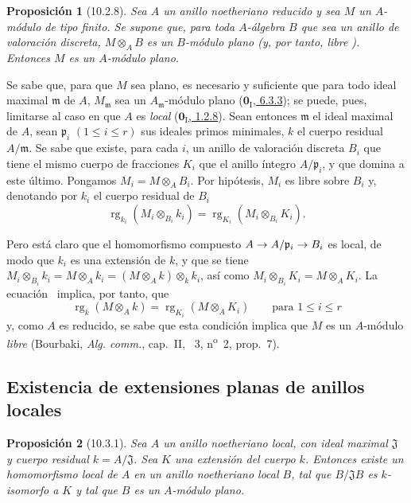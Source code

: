 \documentclass[10pt,oneside,openany]{book}
\theoremstyle{egaenv}\newtheorem*{env}{---}
\theoremstyle{egastatement}
\newtheorem*{proposition}{Proposición}
\theoremstyle{egadescription}
\renewcommand{\leq}{\leqslant}
\renewcommand{\to}{\mathchoice{\longrightarrow}{\rightarrow}{\rightarrow}{\rightarrow}}
\begin{document}
\begin{proposition}[10.2.8]
\label{0.10.2.8}
\label{0.10.2.8-fr}
Sea $A$ un anillo noetheriano reducido y sea $M$ un $A$-módulo de tipo finito.
Se supone que, para toda $A$-álgebra $B$ que sea un anillo de valoración discreta, $M\otimes_A B$ es un $B$-módulo plano (y, por tanto, libre ).
Entonces $M$ es un $A$-módulo plano.
\end{proposition}


Se sabe que, para que $M$ sea plano, es necesario y suficiente que para todo ideal maximal $\mathfrak m$ de $A$, $M_{\mathfrak m}$ sea un $A_{\mathfrak m}$-módulo plano (\hyperref[0.6.3.3-fr]{$\mathbf{0}_{\mathrm I}$, 6.3.3}); se puede, pues, limitarse al caso en que $A$ es \emph{local} (\hyperref[0.1.2.8-fr]{$\mathbf{0}_{\mathrm I}$, 1.2.8}). Sean entonces $\mathfrak m$ el ideal maximal de $A$, sean $\mathfrak p_i$
$(1\leq i\leq r)$ sus ideales primos minimales, $k$ el cuerpo residual $A/\mathfrak m$.
Se sabe  que existe, para cada $i$, un anillo de valoración discreta $B_i$ que tiene el mismo cuerpo de fracciones $K_i$ que el anillo íntegro $A/\mathfrak p_i$, y que domina a este último. Pongamos $M_i=M\otimes_A B_i$.
Por hipótesis, $M_i$ es libre sobre $B_i$ y, denotando por $k_i$ el cuerpo residual de $B_i$
\[
\label{0.10.2.8.1-fr}
  \operatorname{rg}_{k_i}(M_i\otimes_{B_i}k_i)
  =\operatorname{rg}_{K_i}(M_i\otimes_{B_i}K_i).
  \tag{10.2.8.1}
\]

Pero está claro que el homomorfismo compuesto $A\to A/\mathfrak p_i\to B_i$ es local, de modo que $k_i$ es una extensión de $k$, y que se tiene $M_i\otimes_{B_i}k_i=M\otimes_A k_i=(M\otimes_A k)\otimes_k k_i$, así como $M_i\otimes_{B_i}K_i=M\otimes_A K_i$.
La ecuación~ implica, por tanto, que
\[
  \operatorname{rg}_k(M\otimes_A k)=\operatorname{rg}_{K_i}(M\otimes_A K_i)
  \qquad\text{para }1\leq i\leq r
\]
y, como $A$ es reducido, se sabe que esta condición implica que $M$ es un $A$-módulo \emph{libre} (Bourbaki, \emph{Alg. comm.}, cap.~II, \textsection~3, n\textsuperscript{o}~2, prop.~7).


\subsection{Existencia de extensiones planas de anillos locales}
\label{subsection:0.10.3}
\label{subsection:0.10.3-fr}

\begin{proposition}[10.3.1]
\label{0.10.3.1}
\label{0.10.3.1-fr}
Sea $A$ un anillo noetheriano local, con ideal maximal $\mathfrak J$ y cuerpo residual $k=A/\mathfrak J$.
Sea $K$ una extensión del cuerpo $k$.
Entonces existe un homomorfismo local de $A$ en un anillo noetheriano local $B$, tal que $B/\mathfrak J B$ es $k$-isomorfo a $K$ y tal que $B$ es un $A$-módulo plano.
\end{proposition}
\end{document}
